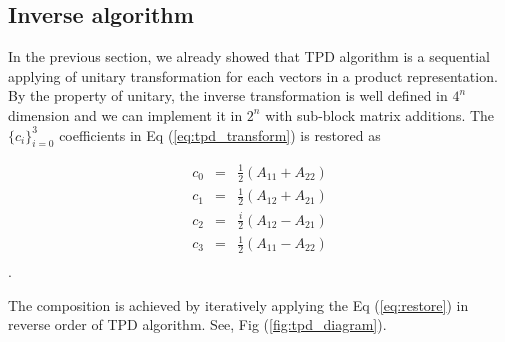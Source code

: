 \documentclass[twocolumn]{article}
\begin{document}
\subsection{Inverse algorithm}

In the previous section, we already showed that TPD algorithm is a sequential 
applying of unitary transformation for each vectors in a product representation.
By the property of unitary, the inverse transformation is well defined 
in $4^n$ dimension and we can implement it in $2^n$ with 
sub-block matrix additions. 
The $\{c_i\}_{i=0}^3$ coefficients in Eq (\ref{eq:tpd_transform}) is restored as 

\begin{equation}
    \label{eq:restore}
    \begin{array}{ccc}
        c_0 &=& \frac{1}{2} (A_{11} + A_{22})\\
        c_1 &=& \frac{1}{2} (A_{12} + A_{21})\\
        c_2 &=& \frac{i}{2} (A_{12} - A_{21})\\
        c_3 &=& \frac{1}{2} (A_{11} - A_{22})\\
    \end{array}
\end{equation}.

The composition is achieved by iteratively applying the Eq (\ref{eq:restore}) in reverse order of TPD algorithm. 
See, Fig (\ref{fig:tpd_diagram}).
\end{document}
